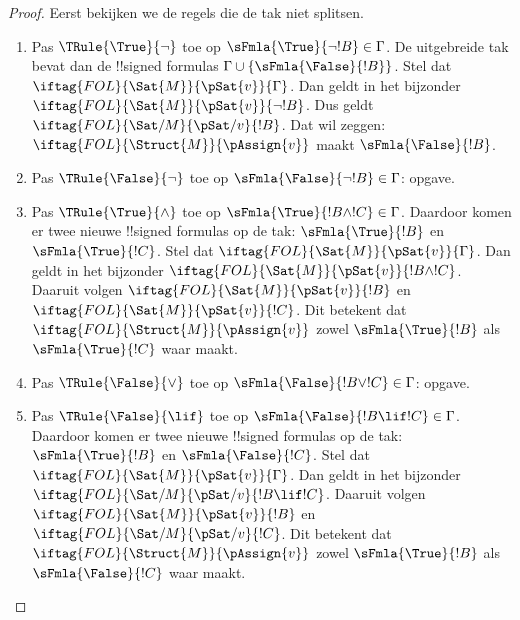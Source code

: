\documentclass[../../../include/open-logic-section]{subfiles}
\begin{document}
\begin{proof}
Eerst bekijken we de regels die de tak niet splitsen.
\begin{enumerate}
\item Pas $\TRule{\True}{\lnot}$ toe op
  $\sFmla{\True}{\lnot !B} \in \Gamma$. De uitgebreide tak bevat dan
  de !!{signed formula}s $\Gamma \cup
  \{\sFmla{\False}{!B}\}$. Stel dat
  $\iftag{FOL}{\Sat{M}}{\pSat{v}}{\Gamma}$. Dan geldt in het bijzonder
  $\iftag{FOL}{\Sat{M}}{\pSat{v}}{\lnot !B}$. Dus geldt
  $\iftag{FOL}{\Sat/{M}}{\pSat/{v}}{!B}$. Dat wil zeggen:
  $\iftag{FOL}{\Struct{M}}{\pAssign{v}}$ maakt
  $\sFmla{\False}{!B}$.
\item Pas $\TRule{\False}{\lnot}$ toe op
  $\sFmla{\False}{\lnot !B} \in \Gamma$: opgave.
\item Pas $\TRule{\True}{\land}$ toe op
  $\sFmla{\True}{!B \land !C} \in \Gamma$. Daardoor komen er twee
  nieuwe !!{signed formula}s op de tak: $\sFmla{\True}{!B}$ en
  $\sFmla{\True}{!C}$. Stel dat
  $\iftag{FOL}{\Sat{M}}{\pSat{v}}{\Gamma}$. Dan geldt in het bijzonder
  $\iftag{FOL}{\Sat{M}}{\pSat{v}}{!B \land !C}$. Daaruit volgen
  $\iftag{FOL}{\Sat{M}}{\pSat{v}}{!B}$ en
  $\iftag{FOL}{\Sat{M}}{\pSat{v}}{!C}$. Dit betekent dat
  $\iftag{FOL}{\Struct{M}}{\pAssign{v}}$ zowel
  $\sFmla{\True}{!B}$ als $\sFmla{\True}{!C}$ waar maakt.
\item Pas $\TRule{\False}{\lor}$ toe op
  $\sFmla{\False}{!B \lor !C} \in \Gamma$: opgave.
\item Pas $\TRule{\False}{\lif}$ toe op
  $\sFmla{\False}{!B \lif !C} \in \Gamma$. Daardoor komen er twee
  nieuwe !!{signed formula}s op de tak: $\sFmla{\True}{!B}$ en
  $\sFmla{\False}{!C}$. Stel dat
  $\iftag{FOL}{\Sat{M}}{\pSat{v}}{\Gamma}$. Dan geldt in het bijzonder
  $\iftag{FOL}{\Sat/{M}}{\pSat/{v}}{!B \lif !C}$. Daaruit volgen
  $\iftag{FOL}{\Sat{M}}{\pSat{v}}{!B}$ en
  $\iftag{FOL}{\Sat/{M}}{\pSat/{v}}{!C}$. Dit betekent dat
  $\iftag{FOL}{\Struct{M}}{\pAssign{v}}$ zowel
  $\sFmla{\True}{!B}$ als $\sFmla{\False}{!C}$ waar maakt.

\end{enumerate}
\end{proof}
\end{document}

